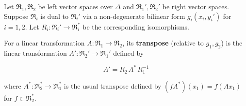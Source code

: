 Let $\mathfrak{R}_1, \mathfrak{R}_2$ be left vector spaces over $\Delta$ and $\mathfrak{R}_1', \mathfrak{R}_2'$ be right vector spaces. Suppose $\mathfrak{R}_i$ is dual to $\mathfrak{R}_i'$ via a non-degenerate bilinear form $g_i(x_i, y_i')$ for $i = 1, 2$. Let $R_i: \mathfrak{R}_i' \to \mathfrak{R}_i^*$ be the corresponding isomorphisms.

For a linear transformation $A: \mathfrak{R}_1 \to \mathfrak{R}_2$, its \textbf{transpose} (relative to $g_1, g_2$) is the linear transformation $A': \mathfrak{R}_2' \to \mathfrak{R}_1'$ defined by

$$A' = R_2 \, A^* \, R_1^{-1}$$

where $A^*: \mathfrak{R}_2^* \to \mathfrak{R}_1^*$ is the usual transpose defined by $(fA^*)(x_1) = f(A x_1)$ for $f \in \mathfrak{R}_2^*$.
